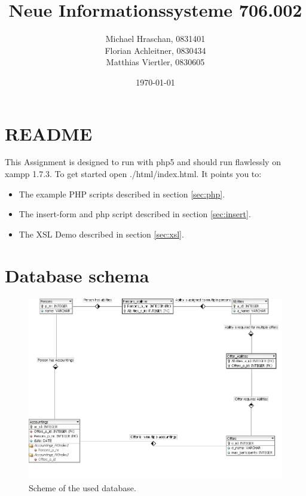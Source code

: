 \documentclass[12pt,a4paper,english]{article}
\title{Neue Informationssysteme 706.002\\}
\date{\today}
\author{Michael Hraschan, 0831401 \\
				Florian Achleitner, 0830434\\
				Matthias Viertler, 0830605 \\}
\begin{document}
\maketitle

\newpage
%
\tableofcontents %
\clearpage
%

\section{README}
This Assignment is designed to run with php5 and should run flawlessly on xampp 1.7.3.
To get started open ./html/index.html.
It points you to:
\begin{itemize}
	\item The example PHP scripts described in section \ref{sec:php}.
	\item The insert-form and php script described in section \ref{sec:insert}.
	\item The XSL Demo described in section \ref{sec:xsl}.
\end{itemize}

\section{Database schema}

\begin{figure}[htbp]
	\centering
		\includegraphics[width=1.00\textwidth]{Images/database_design.png}
	\caption{Scheme of the used database.}
	\label{fig:database_design}
\end{figure}
\end{document}
